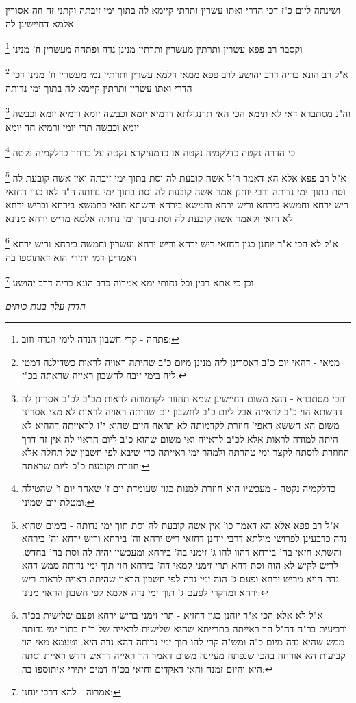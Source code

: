 \documentclass[12pt, openany]{book}
\newcommand{\footnotecomment}[1]{
	\renewcommand\thefootnote{}
	\footnote{#1}}
\newcommand{\commenta}[1]{\footnotecomment{#1}}
\begin{document}
{{ושינתה ליום כ"ז דכי הדרי ואתו עשרין ותרתי קיימא לה בתוך ימי זיבתה וקתני זה וזה אסורין אלמא דחיישינן לה 
\commenta{פתחה - קרי חשבון הנדה לימי הנדה וזוב:}
וקסבר רב פפא עשרין ותרתין מעשרין ותרתין מנינן נדה ופתחה מעשרין וז' מנינן 
\commenta{ממאי - דהאי יום כ"ב דאסרינן ליה מנינן מיום כ"ב שהיתה ראויה לראות כשדילגה דמטי ליה בימי זיבה לחשבון ראייה שראתה בכ"ז:}
א"ל רב הונא בריה דרב יהושע לרב פפא ממאי דלמא עשרין ותרתין נמי מעשרין וז' מנינן דכי הדרי ואתו עשרין ותרתין קיימא לה בתוך ימי נדותה 
\commenta{והכי מסתברא - דהא משום דחיישינן שמא תחזור לקדמותה לראות מכ"ב לכ"ב אסרינן לה דהשתא הוי כ"ב לראייה אבל ליום כ"ב לחשבון יום שהיתה ראויה לראות לא מצי אסרינן משום הא חששא דאפי' חוזרת לקדמותה לא תראה היום שהוא י"ז לראייתה דההיא לא היתה למודה לראות אלא לכ"ב לראייה ואי משום שהוא כ"ב ליום הראוי לה אין זה דרך החוזרת לוסתה לקצר ימי טהרתה ולמהר ימי ראייתה כדי שיבא לפי חשבון של תחלה אלא חוזרת וקובעת כ"כ ליום שראתה: }
וה"נ מסתברא דאי לא תימא הכי האי תרנגולתא דרמיא יומא וכבשה יומא ורמיא יומא וכבשה יומא וכבשה תרי יומי ורמיא חד יומא
\commenta{כדלקמיה נקטה - מעכשיו היא חוזרת למנות כגון שעומדת יום ז' שאחר יום ו' שהטילה ומטלת יום שמיני:}
כי הדרה נקטה כדלקמיה נקטה או כדמעיקרא נקטה על כרחך כדלקמיה נקטה 
\commenta{א"ל רב פפא אלא הא דאמר כו' אין אשה קובעת לה וסת תוך ימי נדותה - בימים שהיא נדה כדבעינן לפרושי מילתא דרבי יוחנן דחזאי ריש ירחא וה' בירחא וריש ירחא וה' בירחא והשתא חזאי בה' בירחא דהוו להו ג' זימני בה' בירחא ומעכשיו יהיה לה וסת בה' בחדש. לריש לקיש לא הוה וסת דהא תרי זימני קמאי דה' בירחא הוי תוך ימי נדותה ממש דהא נדה הויא מריש ירחא ופעם ג' הוה ימי נדה לפי חשבון הראוי שהיתה ראויה לראות ריש ירחא ומדקרי לפעם ג' תוך ימי נדה אלמא לפי חשבון הראוי מנינן:}
א"ל רב פפא אלא הא דאמר ר"ל אשה קובעת לה וסת בתוך ימי זיבתה ואין אשה קובעת לה וסת בתוך ימי נדותה ורבי יוחנן אמר אשה קובעת לה וסת בתוך ימי נדותה ה"ד 
לאו כגון דחזאי ריש ירחא וחמשא בירחא וריש ירחא וחמשא בירחא והשתא חזאי בחמשא בירחא ובריש ירחא לא חזאי
וקאמר אשה קובעת לה וסת בתוך ימי נדותה אלמא מריש ירחא מנינא 
\commenta{א"ל לא אלא הכי א"ר יוחנן כגון דחזיא - תרי זימני בריש ירחא ופעם שלישית בכ"ה ורביעית בר"ח דה"ל הך ראייתה בתרייתא שהיא שלישית לראייה של ר"ח בתוך ימי נדותה ממש שהיא נדה מיום כ"ה ומש"ה קרי להו תוך ימי נדותה דהא נדה היא. וטעמא מאי הוי קביעות הא אורחה בהכי שנפתח מעיינה משום דאמר הך ראייה דראש חדש ראיית וסתה היא והיום זמנה והאי דאקדים וחזאי בכ"ה דמים יתירי איתוספו בה:}
א"ל לא הכי א"ר יוחנן כגון דחזאי ריש ירחא וריש ירחא ועשרין וחמשה בירחא וריש ירחא דאמרינן דמי יתירי הוא דאתוספו בה 
\commenta{אמרוה - להא דרבי יוחנן:}
וכן כי אתא רבין וכל נחותי ימא אמרוה כרב הונא בריה דרב יהושע
\par \par {\large\emph{הדרן עלך בנות כותים}}\par \par }

}
\end{document}
